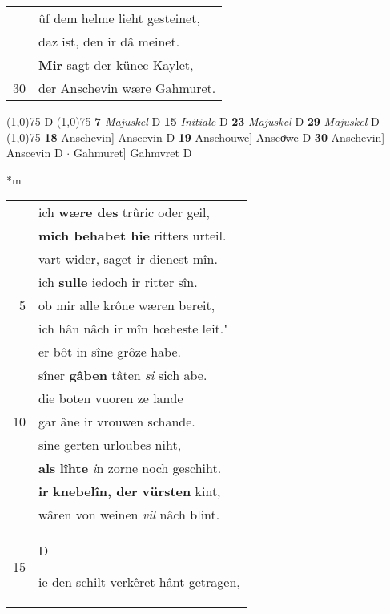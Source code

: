 \documentclass[8pt,a4paper,notitlepage]{article}
\begin{document}
\begin{table}[ht]
\begin{minipage}[t]{0.5\linewidth}
\begin{tabular}{rl}
 & ûf dem helme lieht gesteinet,\\ 
 & daz ist, den ir dâ meinet.\\ 
 & \textbf{Mir} sagt der künec Kaylet,\\ 
30 & der Anschevin wære Gahmuret.\\ 
\end{tabular}
\scriptsize
\line(1,0){75} \newline
D \newline
\line(1,0){75} \newline
\textbf{7} \textit{Majuskel} D  \textbf{15} \textit{Initiale} D  \textbf{23} \textit{Majuskel} D  \textbf{29} \textit{Majuskel} D  \newline
\line(1,0){75} \newline
\textbf{18} Anschevin] Anscevin D \textbf{19} Anschouwe] Anscoͮwe D \textbf{30} Anschevin] Anscevin D  $\cdot$ Gahmuret] Gahmvret D \newline
\end{minipage}
\hspace{0.5cm}
\begin{minipage}[t]{0.5\linewidth}
\small
\begin{center}*m
\end{center}
\begin{tabular}{rl}
 & ich \textbf{wære des} trûric oder geil,\\ 
 & \textbf{mich behabet hie} ritters urteil.\\ 
 & vart wider, saget ir dienest mîn.\\ 
 & ich \textbf{sulle} iedoch ir ritter sîn.\\ 
5 & ob mir alle krône wæren bereit,\\ 
 & ich hân nâch ir mîn hœheste leit."\\ 
 & er bôt in sîne grôze habe.\\ 
 & sîner \textbf{gâben} tâten \textit{si} sich abe.\\ 
 & die boten vuoren ze lande\\ 
10 & gar âne ir vrouwen schande.\\ 
 & sine gerten urloubes niht,\\ 
 & \textbf{als} \textbf{lîhte} \textit{i}n zorne noch geschiht.\\ 
 & \textbf{ir} \textbf{knebelîn, der vürsten} kint,\\ 
 & wâren von weinen \textit{vil} nâch blint.\\ 
15 & \begin{large}D\end{large}ie den schilt verkêret hânt getragen,\\ 

\end{tabular}
\end{minipage}
\end{table}
\end{document}
